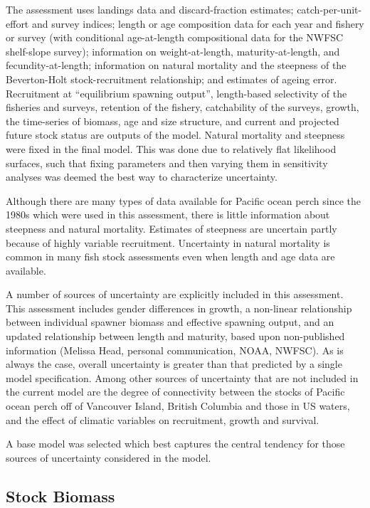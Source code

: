 \documentclass[12pt,]{article}
\begin{document}
The assessment uses landings data and discard-fraction estimates;
catch-per-unit-effort and survey indices; length or age composition data
for each year and fishery or survey (with conditional age-at-length
compositional data for the NWFSC shelf-slope survey); information on
weight-at-length, maturity-at-length, and fecundity-at-length;
information on natural mortality and the steepness of the Beverton-Holt
stock-recruitment relationship; and estimates of ageing error.
Recruitment at ``equilibrium spawning output'', length-based selectivity
of the fisheries and surveys, retention of the fishery, catchability of
the surveys, growth, the time-series of biomass, age and size structure,
and current and projected future stock status are outputs of the model.
Natural mortality and steepness were fixed in the final model. This was
done due to relatively flat likelihood surfaces, such that fixing
parameters and then varying them in sensitivity analyses was deemed the
best way to characterize uncertainty.

Although there are many types of data available for Pacific ocean perch
since the 1980s which were used in this assessment, there is little
information about steepness and natural mortality. Estimates of
steepness are uncertain partly because of highly variable recruitment.
Uncertainty in natural mortality is common in many fish stock
assessments even when length and age data are available.

A number of sources of uncertainty are explicitly included in this
assessment. This assessment includes gender differences in growth, a
non-linear relationship between individual spawner biomass and effective
spawning output, and an updated relationship between length and
maturity, based upon non-published information (Melissa Head, personal
communication, NOAA, NWFSC). As is always the case, overall uncertainty
is greater than that predicted by a single model specification. Among
other sources of uncertainty that are not included in the current model
are the degree of connectivity between the stocks of Pacific ocean perch
off of Vancouver Island, British Columbia and those in US waters, and
the effect of climatic variables on recruitment, growth and survival.

A base model was selected which best captures the central tendency for
those sources of uncertainty considered in the model.

\subsection*{Stock Biomass}\label{stock-biomass}
\end{document}
